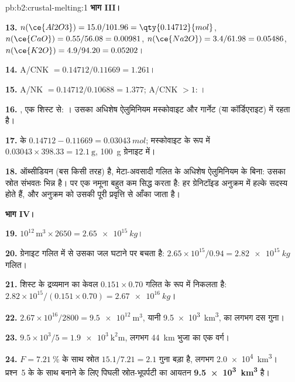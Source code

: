 \begin{solution}{pb:b2:crustal-melting:1}
\noindent\textbf{भाग III।}

\textbf{13.} $n(\ce{Al2O3}) = 15.0/101.96 = \qty{0.14712}{mol}$, $n(\ce{CaO}) =
0.55/56.08 = 0.00981$, $n(\ce{Na2O}) = 3.4/61.98 = 0.05486$, $n(\ce{K2O}) = 4.9/94.20 =
0.05202$।

\textbf{14.} A/CNK $= 0.14712/0.11669 = 1.261$।

\textbf{15.} A/NK $= 0.14712/0.10688 = 1.377$; A/CNK $> 1$: ।

\textbf{16.} , एक शिस्ट से: । उसका अधिशेष ऐलुमिनियम
मस्कोवाइट और गार्नेट (या कॉर्डिएराइट) में रहता है।

\textbf{17.}  के $0.14712 - 0.11669 = \qty{0.03043}{mol}$; मस्कोवाइट के रूप में
$0.03043\times398.33 = \qty{12.1}{\gram}$, \qty{100}{\gram} ग्रेनाइट में।

\textbf{18.} ऑब्सीडियन (बस किसी तरह)  है, मेटा-अवसादी गलित के अधिशेष ऐलुमिनियम के
बिना: उसका स्रोत संभवतः भिन्न है। पर एक नमूना बहुत कम सिद्ध करता है:
हर ग्रेनिटॉइड अनुक्रम में हल्के  सदस्य होते हैं, और अनुक्रम को उसकी पूरी
प्रवृत्ति से आँका जाता है।

\noindent\textbf{भाग IV।}

\textbf{19.} $10^{12}\,\unit{\cubic\metre}\times2650 = \qty{2.65e15}{kg}$।

\textbf{20.} ग्रेनाइट गलित में से उसका जल घटाने पर बचता है: $2.65\times10^{15}/0.94 =
\qty{2.82e15}{kg}$ गलित।

\textbf{21.} शिस्ट के द्रव्यमान का केवल $0.151\times0.70$ गलित के रूप में निकलता है:
$2.82\times10^{15}/(0.151\times0.70) = \qty{2.67e16}{kg}$।

\textbf{22.} $2.67\times10^{16}/2800 = \qty{9.5e12}{\cubic\metre}$, यानी
\qty{9.5e3}{\cubic\kilo\metre},  का लगभग दस गुना।

\textbf{23.} $9.5\times10^3/5 = \qty{1.9e3}{\square\kilo\metre}$, लगभग
\qty{44}{km} भुजा का एक वर्ग।

\textbf{24.} $F = \qty{7.21}{\percent}$ के साथ स्रोत $15.1/7.21 = 2.1$ गुना
बड़ा है, लगभग \qty{2.0e4}{\cubic\kilo\metre}। प्रश्न~5 के
 के साथ  बनाने के लिए पिघली स्रोत-भूपर्पटी का आयतन
\textbf{\qty[text-series-to-math=true]{9.5e3}{\cubic\kilo\metre}} है।
\end{solution}
